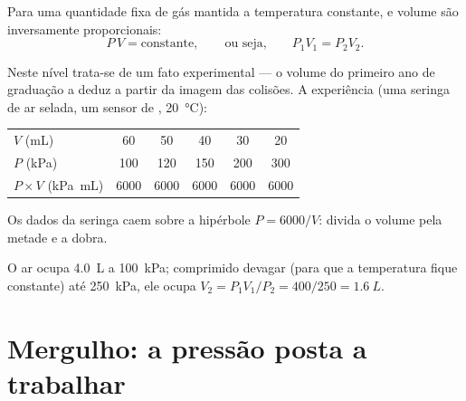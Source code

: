 \begin{proposition}\label{prop:g10:pressure:boyle}
Para uma quantidade fixa de gás mantida a temperatura constante, 
e volume são inversamente proporcionais:
\[
P \, V = \text{constante},
\qquad\text{ou seja,}\qquad
P_1 V_1 = P_2 V_2 .
\]
\end{proposition}
\admitted

\begin{remark}
Neste nível trata-se de um fato experimental --- o volume do primeiro ano
de graduação a deduz a partir da imagem das colisões. A experiência (uma
seringa de ar selada, um sensor de , \qty{20}{\degreeCelsius}):
\begin{center}
\begin{tabular}{lccccc}
$V$ (\unit{mL}) & 60 & 50 & 40 & 30 & 20 \\
$P$ (\unit{kPa}) & 100 & 120 & 150 & 200 & 300 \\
$P \times V$ (\unit{kPa.mL}) & 6000 & 6000 & 6000 & 6000 & 6000
\end{tabular}
\end{center}
\end{remark}

\begin{omfigure}

{\small Os dados da seringa caem sobre a hipérbole $P = 6000/V$: divida o
volume pela metade e a  dobra.}
\end{omfigure}

\begin{example}\label{ex:g10:pressure:boyle}
O ar ocupa \qty{4.0}{L} a \qty{100}{kPa}; comprimido devagar (para que a
temperatura fique constante) até \qty{250}{kPa}, ele ocupa
$V_2 = P_1 V_1 / P_2 = 400/250 = \qty{1.6}{L}$.
\end{example}

\section{Mergulho: a pressão posta a trabalhar}

